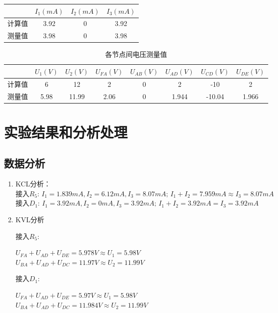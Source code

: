 \documentclass{../source/Experiment}
\begin{document}
\begin{enumerate}
\begin{table}[htbp]
\begin{center}
\begin{tabular}{|c|c|c|c|}
                    \hline
                        & $I_{1}(mA)$ & $I_{2}(mA)$ & $I_{3}(mA)$ \\
                    \hline
                    计算值 & 3.92 & 0 & 3.92 \\
                    \hline
                    测量值 & 3.98 & 0 & 3.98 \\
                    \hline
                    \end{tabular} 
                    \end{center}
                \end{table}
                \begin{table}[htbp]
                    \begin{center}
                    \caption{各节点间电压测量值}
                    \begin{tabular}{|c|c|c|c|c|c|c|c|}
                        \hline
                            & $U_{1}(V)$ & $U_{2}(V)$ & $U_{FA}(V)$ & $U_{AB}(V)$ & $U_{AD}(V)$ & $U_{CD}(V)$ & $U_{DE}(V)$ \\
                        \hline
                        计算值 & 6 & 12 & 2 & 0 & 2 & -10 & 2 \\
                        \hline
                        测量值 & 5.98 & 11.99 & 2.06 & 0 & 1.944 & -10.04 & 1.966 \\
                        \hline
                        \end{tabular}
                    \end{center}
                \end{table}
            \end{enumerate}
    \section{实验结果和分析处理}
        \subsection{数据分析}
            \begin{enumerate}
                \item KCL分析：
                \\ 接入$R_5$: $I_1 = 1.839mA, I_2 = 6.12mA, I_3 = 8.07mA; \, I_1 + I_2 = 7.959mA \approx I_3 = 8.07mA$
                \\ 接入$D_1$: $I_1 = 3.92mA, I_2 = 0mA, I_3 = 3.92mA; \, I_1 + I_2 = 3.92mA = I_3 = 3.92mA$
                \item KVL分析
                \par 接入$R_5$: 
                \par $U_{FA} + U_{AD} + U_{DE} = 5.978V \approx U_1 = 5.98V$
                \\ $U_{BA} + U_{AD} + U_{DC} = 11.97V \approx U_2 = 11.99V$
                \par 接入$D_1$: 
                \par $U_{FA} + U_{AD} + U_{DE} = 5.97V \approx U_1 = 5.98V$
                \\ $U_{BA} + U_{AD} + U_{DC} = 11.984V \approx U_2 = 11.99V$
            \end{enumerate}
\end{document}
